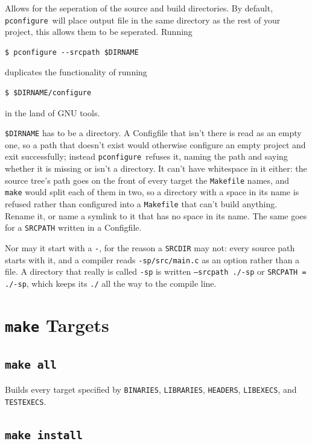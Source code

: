\documentclass{article}
\newcommand{\pconfigure}{\texttt{pconfigure}}
\begin{document}
Allows for the seperation of the source and build directories.  By
default, \pconfigure\ will place output file in the same directory as
the rest of your project, this allows them to be seperated.  Running
\begin{verbatim}
$ pconfigure --srcpath $DIRNAME
\end{verbatim}
duplicates the functionality of running
\begin{verbatim}
$ $DIRNAME/configure
\end{verbatim}
in the land of GNU tools.

\texttt{\$DIRNAME} has to be a directory.  A Configfile that isn't
there is read as an empty one, so a path that doesn't exist would
otherwise configure an empty project and exit successfully; instead
\pconfigure\ refuses it, naming the path and saying whether it is
missing or isn't a directory.  It can't have whitespace in it either:
the source tree's path goes on the front of every target the
\texttt{Makefile} names, and \texttt{make} would split each of them
in two, so a directory with a space in its name is refused rather than
configured into a \texttt{Makefile} that can't build anything.
Rename it, or name a symlink to it that has no space in its name.  The
same goes for a \texttt{SRCPATH} written in a Configfile.

Nor may it start with a \texttt{-}, for the reason a \texttt{SRCDIR}
may not: every source path starts with it, and a compiler reads
\texttt{-sp/src/main.c} as an option rather than a file.  A directory
that really is called \texttt{-sp} is written \texttt{--srcpath ./-sp}
or \texttt{SRCPATH = ./-sp}, which keeps its \texttt{./} all the way
to the compile line.

\section{\texttt{make} Targets \label{make}}

\subsection{\texttt{make all} \label{make:all}}

Builds every target specified by \texttt{BINARIES},
\texttt{LIBRARIES}, \texttt{HEADERS}, \texttt{LIBEXECS}, and
\texttt{TESTEXECS}.

\subsection{\texttt{make install} \label{make:install}}
\end{document}
